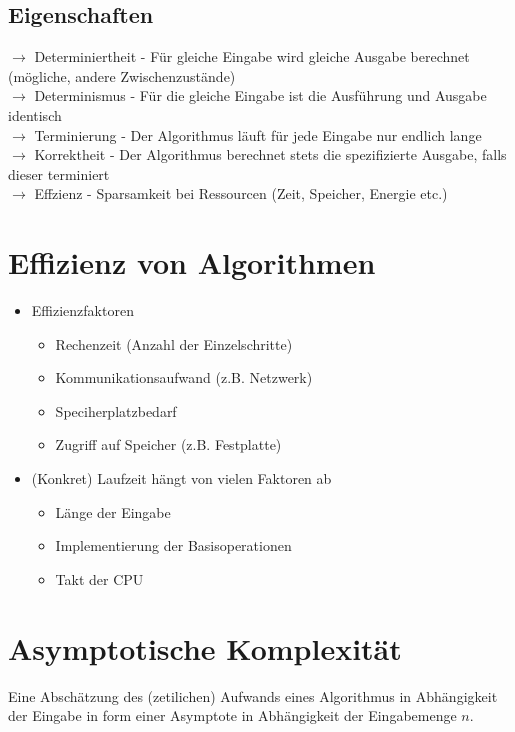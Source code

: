 	\subsection{Eigenschaften}
	$\rightarrow$ Determiniertheit - Für gleiche Eingabe wird gleiche Ausgabe berechnet (mögliche, andere Zwischenzustände) \\
	$\rightarrow$ Determinismus - Für die gleiche Eingabe ist die Ausführung und Ausgabe identisch \\
	$\rightarrow$ Terminierung - Der Algorithmus läuft für jede Eingabe nur endlich lange \\
	$\rightarrow$ Korrektheit - Der Algorithmus berechnet stets die spezifizierte Ausgabe, falls dieser terminiert \\
	$\rightarrow$ Effzienz - Sparsamkeit bei Ressourcen (Zeit, Speicher, Energie etc.)



\vspace{1.5cm}
\section{Effizienz von Algorithmen} %

	\begin{itemize}
		\item Effizienzfaktoren
		\begin{itemize}
			\item Rechenzeit (Anzahl der Einzelschritte)
			\item Kommunikationsaufwand (z.B. Netzwerk)
			\item Speciherplatzbedarf 
			\item Zugriff auf Speicher (z.B. Festplatte) \\
		\end{itemize}
		\item  (Konkret) Laufzeit hängt von vielen Faktoren ab
		\begin{itemize}
			\item Länge der Eingabe 
			\item Implementierung der Basisoperationen
			\item Takt der CPU
		\end{itemize}
	\end{itemize}



\vspace{1.5cm}
\section{Asymptotische Komplexität} %
	Eine Abschätzung des (zetilichen) Aufwands eines Algorithmus in Abhängigkeit der Eingabe
	in form einer Asymptote in Abhängigkeit der Eingabemenge $n$.

